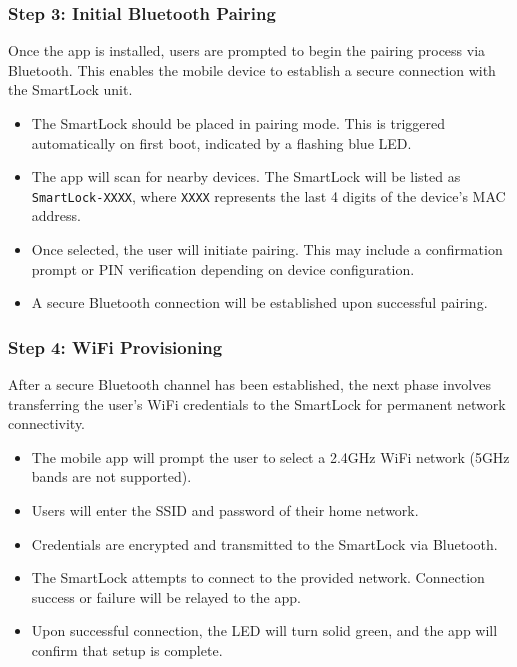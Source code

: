 \subsubsection{Step 3: Initial Bluetooth Pairing}

Once the app is installed, users are prompted to begin the pairing process via Bluetooth. This enables the mobile device to establish a secure connection with the SmartLock unit.

\begin{itemize}
    \item The SmartLock should be placed in pairing mode. This is triggered automatically on first boot, indicated by a flashing blue LED.
    \item The app will scan for nearby devices. The SmartLock will be listed as \texttt{SmartLock-XXXX}, where \texttt{XXXX} represents the last 4 digits of the device's MAC address.
    \item Once selected, the user will initiate pairing. This may include a confirmation prompt or PIN verification depending on device configuration.
    \item A secure Bluetooth connection will be established upon successful pairing.
\end{itemize}

\subsubsection{Step 4: WiFi Provisioning}

After a secure Bluetooth channel has been established, the next phase involves transferring the user's WiFi credentials to the SmartLock for permanent network connectivity.

\begin{itemize}
    \item The mobile app will prompt the user to select a 2.4GHz WiFi network (5GHz bands are not supported).
    \item Users will enter the SSID and password of their home network.
    \item Credentials are encrypted and transmitted to the SmartLock via Bluetooth.
    \item The SmartLock attempts to connect to the provided network. Connection success or failure will be relayed to the app.
    \item Upon successful connection, the LED will turn solid green, and the app will confirm that setup is complete.
\end{itemize}

